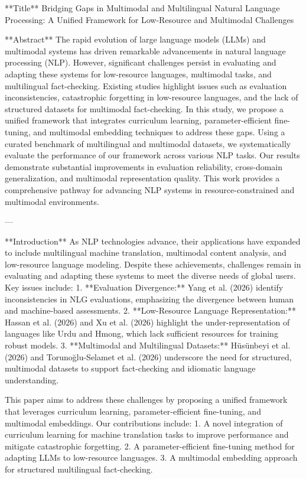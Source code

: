 **Title**  
Bridging Gaps in Multimodal and Multilingual Natural Language Processing: A Unified Framework for Low-Resource and Multimodal Challenges  

**Abstract**  
The rapid evolution of large language models (LLMs) and multimodal systems has driven remarkable advancements in natural language processing (NLP). However, significant challenges persist in evaluating and adapting these systems for low-resource languages, multimodal tasks, and multilingual fact-checking. Existing studies highlight issues such as evaluation inconsistencies, catastrophic forgetting in low-resource languages, and the lack of structured datasets for multimodal fact-checking. In this study, we propose a unified framework that integrates curriculum learning, parameter-efficient fine-tuning, and multimodal embedding techniques to address these gaps. Using a curated benchmark of multilingual and multimodal datasets, we systematically evaluate the performance of our framework across various NLP tasks. Our results demonstrate substantial improvements in evaluation reliability, cross-domain generalization, and multimodal representation quality. This work provides a comprehensive pathway for advancing NLP systems in resource-constrained and multimodal environments.  

---

**Introduction**  
As NLP technologies advance, their applications have expanded to include multilingual machine translation, multimodal content analysis, and low-resource language modeling. Despite these achievements, challenges remain in evaluating and adapting these systems to meet the diverse needs of global users. Key issues include:  
1. **Evaluation Divergence:** Yang et al. (2026) identify inconsistencies in NLG evaluations, emphasizing the divergence between human and machine-based assessments.  
2. **Low-Resource Language Representation:** Hassan et al. (2026) and Xu et al. (2026) highlight the under-representation of languages like Urdu and Hmong, which lack sufficient resources for training robust models.  
3. **Multimodal and Multilingual Datasets:** Hüsünbeyi et al. (2026) and Torunoğlu-Selamet et al. (2026) underscore the need for structured, multimodal datasets to support fact-checking and idiomatic language understanding.  

This paper aims to address these challenges by proposing a unified framework that leverages curriculum learning, parameter-efficient fine-tuning, and multimodal embeddings. Our contributions include:  
1. A novel integration of curriculum learning for machine translation tasks to improve performance and mitigate catastrophic forgetting.  
2. A parameter-efficient fine-tuning method for adapting LLMs to low-resource languages.  
3. A multimodal embedding approach for structured multilingual fact-checking.  

